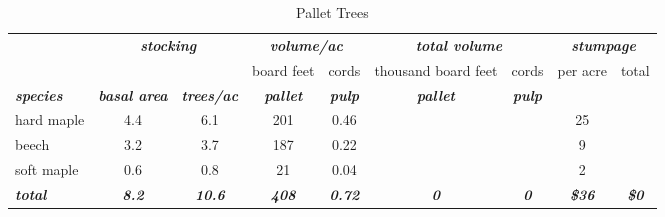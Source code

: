 \documentclass[landscape]{article}
\begin{document}
\begin{table}[H]

\caption{\label{tab:unnamed-chunk-13}Pallet Trees}
\fontsize{10}{12}\selectfont
\begin{tabular}[t]{lcccccccc}
\toprule
\multicolumn{1}{c}{\em{\textbf{ }}} & \multicolumn{2}{c}{\em{\textbf{stocking}}} & \multicolumn{2}{c}{\em{\textbf{volume/ac }}} & \multicolumn{2}{c}{\em{\textbf{total volume}}} & \multicolumn{2}{c}{\em{\textbf{stumpage}}} \\
\cmidrule(l{3pt}r{3pt}){2-3} \cmidrule(l{3pt}r{3pt}){4-5} \cmidrule(l{3pt}r{3pt}){6-7} \cmidrule(l{3pt}r{3pt}){8-9}
\multicolumn{3}{c}{ } & \multicolumn{1}{c}{board feet} & \multicolumn{1}{c}{cords} & \multicolumn{1}{c}{thousand board feet} & \multicolumn{1}{c}{cords} & \multicolumn{1}{c}{per acre} & \multicolumn{1}{c}{total} \\
\cmidrule(l{3pt}r{3pt}){4-4} \cmidrule(l{3pt}r{3pt}){5-5} \cmidrule(l{3pt}r{3pt}){6-6} \cmidrule(l{3pt}r{3pt}){7-7} \cmidrule(l{3pt}r{3pt}){8-8} \cmidrule(l{3pt}r{3pt}){9-9}
\rowcolor[HTML]{DCDCDC}  \em{\textbf{species}} & \em{\textbf{basal area}} & \em{\textbf{trees/ac}} & \em{\textbf{pallet}} & \em{\textbf{pulp}} & \em{\textbf{pallet}} & \em{\textbf{pulp}} & \em{\textbf{ }} & \em{\textbf{ }}\\
\midrule
\rowcolor{gray!6}  hard maple & 4.4 & 6.1 & 201 & 0.46 &  &  & 25 & \\
 
beech & 3.2 & 3.7 & 187 & 0.22 &  &  & 9 & \\
 
\rowcolor{gray!6}  soft maple & 0.6 & 0.8 & 21 & 0.04 &  &  & 2 & \\
 
\rowcolor[HTML]{DCDCDC}  \em{\textbf{total}} & \em{\textbf{8.2}} & \em{\textbf{10.6}} & \em{\textbf{408}} & \em{\textbf{0.72}} & \em{\textbf{0}} & \em{\textbf{0}} & \em{\textbf{\$36}} & \em{\textbf{\$0}}\\
\bottomrule
\end{tabular}
\end{table}
\end{document}
